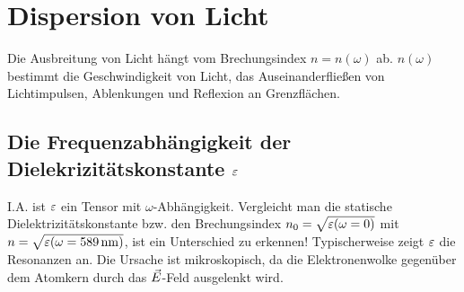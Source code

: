 
\chapter{Dispersion von Licht}

Die Ausbreitung von Licht hängt vom Brechungsindex $n=n(\omega)$
ab. $n(\omega)$ bestimmt die Geschwindigkeit von Licht, das
Auseinanderfließen von Lichtimpulsen, Ablenkungen und Reflexion an
Grenzflächen. 

\section{Die Frequenzabhängigkeit der Dielekrizitätskonstante $\varepsilon$}
I.A. ist $\varepsilon$ ein Tensor mit $\omega$-Abhängigkeit. Vergleicht man
die statische Dielektrizitätskonstante bzw. den Brechungsindex
$n_0=\sqrt{\varepsilon(\omega=0)}$ mit $
n=\sqrt{\varepsilon(\omega=\SI{589}{\nano\meter})}$, ist ein Unterschied zu
erkennen! Typischerweise zeigt $\varepsilon$ die Resonanzen an. Die Ursache
ist mikroskopisch, da die Elektronenwolke gegenüber dem Atomkern durch
das $\vec{E}$-Feld ausgelenkt wird.
